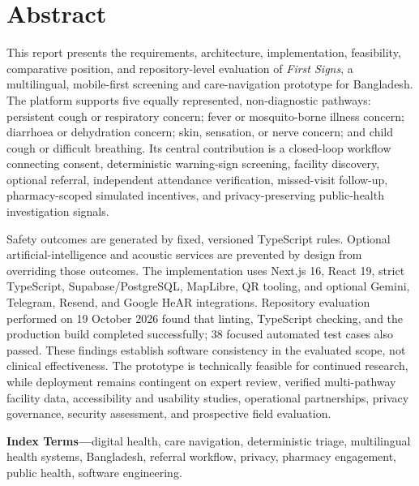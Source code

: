 \documentclass[12pt,onecolumn]{IEEEtran}
\newcommand{\product}{\textit{First Signs}}
\begin{document}
\section*{Abstract}
This report presents the requirements, architecture, implementation, feasibility, comparative position, and repository-level evaluation of \product, a multilingual, mobile-first screening and care-navigation prototype for Bangladesh. The platform supports five equally represented, non-diagnostic pathways: persistent cough or respiratory concern; fever or mosquito-borne illness concern; diarrhoea or dehydration concern; skin, sensation, or nerve concern; and child cough or difficult breathing. Its central contribution is a closed-loop workflow connecting consent, deterministic warning-sign screening, facility discovery, optional referral, independent attendance verification, missed-visit follow-up, pharmacy-scoped simulated incentives, and privacy-preserving public-health investigation signals.

Safety outcomes are generated by fixed, versioned TypeScript rules. Optional artificial-intelligence and acoustic services are prevented by design from overriding those outcomes. The implementation uses Next.js 16, React 19, strict TypeScript, Supabase/PostgreSQL, MapLibre, QR tooling, and optional Gemini, Telegram, Resend, and Google HeAR integrations. Repository evaluation performed on 19 October 2026 found that linting, TypeScript checking, and the production build completed successfully; 38 focused automated test cases also passed. These findings establish software consistency in the evaluated scope, not clinical effectiveness. The prototype is technically feasible for continued research, while deployment remains contingent on expert review, verified multi-pathway facility data, accessibility and usability studies, operational partnerships, privacy governance, security assessment, and prospective field evaluation.

\vspace{5mm}\noindent\textbf{Index Terms---}digital health, care navigation, deterministic triage, multilingual health systems, Bangladesh, referral workflow, privacy, pharmacy engagement, public health, software engineering.

\clearpage\tableofcontents
\clearpage\listoffigures{}
\clearpage\listoftables{}
\clearpage{}\setcounter{page}{1}
\end{document}
